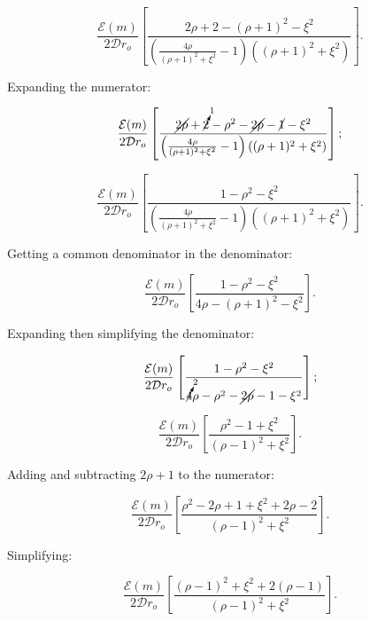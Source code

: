 \begin{equation}
    \frac{\mathcal{E}(m)}{2\mathcal{D}r_o} \left[ \frac{2\rho + 2  -(\rho+1)^2 - \xi^2}{\left(\frac{4\rho}{(\rho+1)^2+\xi^2}-1\right)\left((\rho+1)^2+\xi^2\right)} \right].
\end{equation}

\noindent Expanding the numerator:

\begin{equation}
    \frac{\mathcal{E}(m)}{2\mathcal{D}r_o} \left[ \frac{\cancel{2\rho} + \cancelto{1}{2}  -\rho^2-\cancel{2\rho}-\cancel{1} - \xi^2}{\left(\frac{4\rho}{(\rho+1)^2+\xi^2}-1\right)\left((\rho+1)^2+\xi^2\right)} \right];
\end{equation}

\begin{equation}
    \frac{\mathcal{E}(m)}{2\mathcal{D}r_o} \left[ \frac{1  -\rho^2 - \xi^2}{\left(\frac{4\rho}{(\rho+1)^2+\xi^2}-1\right)\left((\rho+1)^2+\xi^2\right)} \right].
\end{equation}

\noindent Getting a common denominator in the denominator:

\begin{equation}
    \frac{\mathcal{E}(m)}{2\mathcal{D}r_o} \left[ \frac{1  -\rho^2 - \xi^2}{4\rho-(\rho+1)^2-\xi^2} \right].
\end{equation}

\noindent Expanding then simplifying the denominator:

\begin{equation}
    \frac{\mathcal{E}(m)}{2\mathcal{D}r_o} \left[ \frac{1  -\rho^2 - \xi^2}{\cancelto{2}{4}\rho-\rho^2-\cancel{2\rho}-1-\xi^2} \right];
\end{equation}

\begin{equation}
    \frac{\mathcal{E}(m)}{2\mathcal{D}r_o} \left[ \frac{\rho^2 - 1 + \xi^2}{(\rho-1)^2+\xi^2} \right].
\end{equation}

\noindent Adding and subtracting \(2\rho + 1\) to the numerator:

\begin{equation}
    \frac{\mathcal{E}(m)}{2\mathcal{D}r_o} \left[ \frac{\rho^2 -2\rho + 1 + \xi^2 + 2\rho - 2}{(\rho-1)^2+\xi^2} \right].
\end{equation}

\noindent Simplifying:

\begin{equation}
    \frac{\mathcal{E}(m)}{2\mathcal{D}r_o} \left[ \frac{(\rho- 1)^2 + \xi^2 + 2(\rho - 1)}{(\rho-1)^2+\xi^2} \right].
\end{equation}

